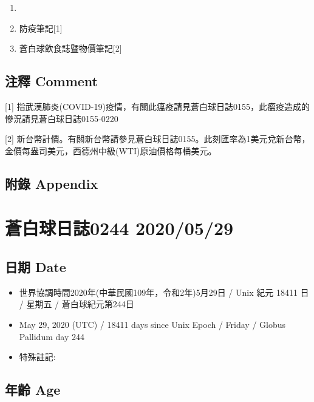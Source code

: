 \documentclass[
]{article}
\providecommand{\tightlist}{%
  \setlength{\itemsep}{0pt}\setlength{\parskip}{0pt}}
\begin{document}
\begin{enumerate}
\def\labelenumi{\arabic{enumi}.}
\item
\item
  防疫筆記{[}1{]}
\item
  蒼白球飲食誌暨物價筆記{[}2{]}
\end{enumerate}

\hypertarget{ux6ce8ux91cb-comment-27}{%
\subsection{注釋 Comment}\label{ux6ce8ux91cb-comment-27}}

{[}1{]}
指武漢肺炎(COVID-19)疫情，有關此瘟疫請見蒼白球日誌0155，此瘟疫造成的慘況請見蒼白球日誌0155-0220

{[}2{]}
新台幣計價。有關新台幣請參見蒼白球日誌0155。此刻匯率為1美元兌新台幣，金價每盎司美元，西德州中級(WTI)原油價格每桶美元。

\hypertarget{ux9644ux9304-appendix-27}{%
\subsection{附錄 Appendix}\label{ux9644ux9304-appendix-27}}

\hypertarget{ux84bcux767dux7403ux65e5ux8a8c0244-20200529}{%
\section{蒼白球日誌0244
2020/05/29}\label{ux84bcux767dux7403ux65e5ux8a8c0244-20200529}}

\hypertarget{ux65e5ux671f-date-28}{%
\subsection{日期 Date}\label{ux65e5ux671f-date-28}}

\begin{itemize}
\tightlist
\item
  世界協調時間2020年(中華民國109年，令和2年)5月29日 / Unix 紀元 18411 日
  / 星期五 / 蒼白球紀元第244日
\item
  May 29, 2020 (UTC) / 18411 days since Unix Epoch / Friday / Globus
  Pallidum day 244
\item
  特殊註記:
\end{itemize}

\hypertarget{ux5e74ux9f61-age-28}{%
\subsection{年齡 Age}\label{ux5e74ux9f61-age-28}}
\end{document}
